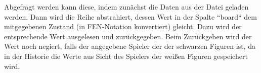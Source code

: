     Abgefragt werden kann diese, indem zunächst die Daten aus der Datei
geladen werden. Dann wird die Reihe abstrahiert, dessen Wert in der
Spalte ``board`` dem mitgegebenen Zustand (in FEN-Notation konvertiert)
gleicht. Dazu wird der entsprechende Wert ausgelesen und zurückgegeben.
Beim Zurückgeben wird der Wert noch negiert, falls der angegebene
Spieler der der schwarzen Figuren ist, da in der Historie die Werte aus
Sicht des Spielers der weißen Figuren gespeichert wird.


